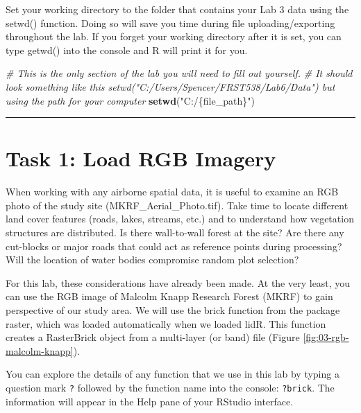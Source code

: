 \documentclass[
]{book}
\newenvironment{Shaded}{\begin{snugshade}}{\end{snugshade}}
\newcommand{\CommentTok}[1]{\textcolor[rgb]{0.56,0.35,0.01}{\textit{#1}}}
\newcommand{\FunctionTok}[1]{\textcolor[rgb]{0.13,0.29,0.53}{\textbf{#1}}}
\newcommand{\NormalTok}[1]{#1}
\newcommand{\StringTok}[1]{\textcolor[rgb]{0.31,0.60,0.02}{#1}}
\begin{document}
Set your working directory to the folder that contains your Lab 3 data using the setwd() function. Doing so will save you time during file uploading/exporting throughout the lab. If you forget your working directory after it is set, you can type getwd() into the console and R will print it for you.

\begin{Shaded}
\begin{Highlighting}[]
\CommentTok{\# This is the only section of the lab you will need to fill out yourself. }
\CommentTok{\# It should look something like this setwd("C:/Users/Spencer/FRST538/Lab6/Data") but using the path for your computer }
\FunctionTok{setwd}\NormalTok{(}\StringTok{"C:/\{file\_path\}"}\NormalTok{)}
\end{Highlighting}
\end{Shaded}

\begin{center}\rule{0.5\linewidth}{0.5pt}\end{center}

\hypertarget{task-1-load-rgb-imagery}{%
\section*{Task 1: Load RGB Imagery}\label{task-1-load-rgb-imagery}}

When working with any airborne spatial data, it is useful to examine an RGB photo of the study site (MKRF\_Aerial\_Photo.tif). Take time to locate different land cover features (roads, lakes, streams, etc.) and to understand how vegetation structures are distributed. Is there wall-to-wall forest at the site? Are there any cut-blocks or major roads that could act as reference points during processing? Will the location of water bodies compromise random plot selection?

For this lab, these considerations have already been made. At the very least, you can use the RGB image of Malcolm Knapp Research Forest (MKRF) to gain perspective of our study area. We will use the brick function from the package raster, which was loaded automatically when we loaded lidR. This function creates a RasterBrick object from a multi-layer (or band) file (Figure \ref{fig:03-rgb-malcolm-knapp}).

You can explore the details of any function that we use in this lab by typing a question mark \texttt{?} followed by the function name into the console: \texttt{?brick}. The information will appear in the Help pane of your RStudio interface.
\end{document}
